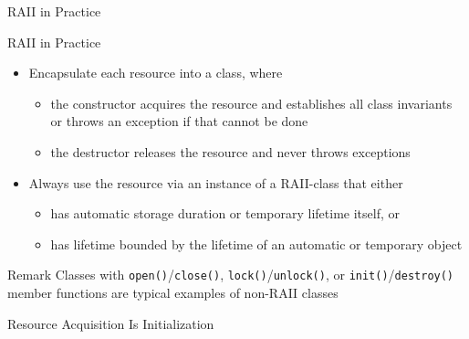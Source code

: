 \begin{frame}{RAII in Practice}{}
  \begin{block}{RAII in Practice}
    \begin{itemize}
    \item
      Encapsulate each resource into a class, where
      \begin{itemize}
      \item
        the constructor acquires the resource and establishes all class invariants or throws an exception if that cannot be done
      \item
        the destructor releases the resource and never throws exceptions
      \end{itemize}
    \item
      Always use the resource via an instance of a RAII-class that either
      \begin{itemize}
      \item
        has automatic storage duration or temporary lifetime itself, or
      \item
        has lifetime bounded by the lifetime of an automatic or temporary object
      \end{itemize}
    \end{itemize}
  \end{block}

  \begin{block}{Remark}
    Classes with \lstinline!open()!/\lstinline!close()!, \lstinline!lock()!/\lstinline!unlock()!, or \lstinline!init()!/\lstinline!destroy()! member functions are typical examples of non-RAII classes
  \end{block}
\end{frame}

\begin{frame}{Resource Acquisition Is Initialization}{}
  \begin{example}
  \end{example}
\end{frame}

